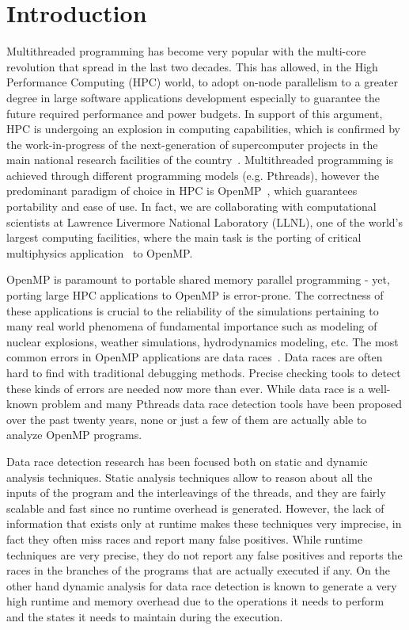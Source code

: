 \section{Introduction}
\label{sec:introduction}

Multithreaded programming has become very popular with the multi-core
revolution that spread in the last two decades.
%
This has allowed, in the High Performance Computing (HPC) world, to adopt
on-node parallelism to a greater degree in large software applications
development especially to guarantee the future required performance and power
budgets.
%
In support of this argument, HPC is undergoing an explosion in
computing capabilities, which is confirmed by the work-in-progress of the
next-generation of supercomputer projects in the main national research
facilities of the country~\cite{sierra, summit, trinity}.
%
Multithreaded programming is achieved through different programming models
(e.g. Pthreads), however the predominant paradigm of choice in HPC is
OpenMP~\cite{ompdoc}, which guarantees portability and ease of use.
%
In fact, we are collaborating with computational scientists at Lawrence
Livermore National Laboratory (LLNL), one of the world's largest computing
facilities, where the main task is the porting of critical multiphysics
application~\cite{llnl-apps} to OpenMP.

OpenMP is paramount to portable shared memory parallel programming - yet,
porting large HPC applications to OpenMP is error-prone.
%
The correctness of these applications is crucial to the reliability of the
simulations pertaining to many real world phenomena of fundamental importance
such as modeling of nuclear explosions, weather simulations, hydrodynamics
modeling, etc.
%
The most common errors in OpenMP applications are data
races~\cite{sus_common_2008}.
%
Data races are often hard to find with traditional debugging methods.
%
Precise checking tools to detect these kinds of errors are needed now more
than ever.
%
While data race is a well-known problem and many Pthreads data race detection
tools have been proposed over the past twenty years, none or just a few of
them are actually able to analyze OpenMP programs.

Data race detection research has been focused both on static and dynamic
analysis techniques.
%
Static analysis techniques allow to reason about all the inputs of the program
and the interleavings of the threads, and they are fairly scalable and fast
since no runtime overhead is generated.
%
However, the lack of information that exists only at runtime makes these
techniques very imprecise, in fact they often miss races and report many false
positives.
%
While runtime techniques are very precise, they do not report any false
positives and reports the races in the branches of the programs that are
actually executed if any.
%
On the other hand dynamic analysis for data race detection is known to
generate a very high runtime and memory overhead due to the operations it
needs to perform and the states it needs to maintain during the execution.

